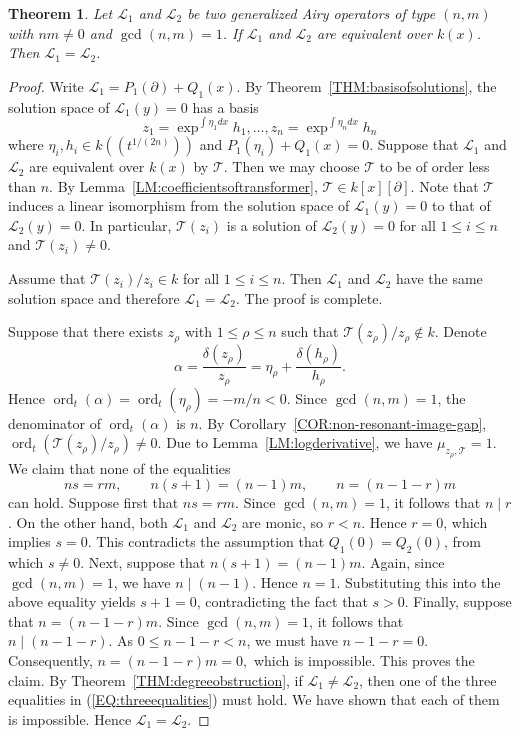 \documentclass{article}
\newtheorem{theorem}{Theorem}[section]
\DeclareMathOperator{\ord}{ord}
\newcommand{\pa}{\partial}
\newcommand{\calL}{{\mathcal{L}}}
\newcommand{\calT}{{\mathcal{T}}}
\begin{document}
\begin{theorem}
  \label{THM:Katzproblem}
  Let $\calL_1$ and $\calL_2$ be two generalized Airy operators of type $(n, m)$ with $nm\neq 0$ 
  and $\gcd(n,m)=1$. If $\calL_1$ and $\calL_2$ are equivalent over $k(x)$. Then $\calL_1 = \calL_2$.
\end{theorem}
\begin{proof}
  Write $\calL_1=P_1(\partial)+Q_1(x)$. By Theorem~\ref{THM:basisofsolutions},
  the solution space of $\calL_1(y)=0$ has a basis 
  $$
    z_1=\exp^{\int \eta_1 dx }h_1, \dots, z_n=\exp^{\int \eta_n dx} h_n
  $$
  where $\eta_i ,h_i\in k((t^{1/(2n)}))$ and $P_1(\eta_i)+Q_1(x)=0$.
  Suppose that $\calL_1$ and $\calL_2$ are equivalent over $k(x)$ by $\calT$. Then 
  we may choose $\calT$ to be of order less than $n$. By Lemma~\ref{LM:coefficientsoftransformer}, 
  $\calT\in k[x][\pa]$. Note that $\calT$ induces a linear isomorphism from 
  the solution space of $\calL_1(y)=0$ to that of $\calL_2(y)=0$. In particular, 
  $\calT(z_i)$ is a solution of $\calL_2(y)=0$ for all $1\leq i \leq n$ and $\calT(z_i)\neq 0$.

  Assume that $\calT(z_i)/z_i\in k$ for all $1\leq i \leq n$. Then $\calL_1$ and $\calL_2$
  have the same solution space and therefore $\calL_1=\calL_2$. The proof is complete. 
  
  Suppose that there exists $z_\rho$ with $1\leq \rho \leq n$ such that $\calT(z_\rho)/z_\rho \notin k$. Denote 
  $$
   \alpha=\frac{\delta(z_\rho)}{z_\rho}=\eta_\rho+\frac{\delta(h_\rho)}{h_\rho}.
  $$
  Hence $\ord_t(\alpha)=\ord_t(\eta_\rho)=-m/n<0$.
  Since $\gcd(n,m)=1$, the denominator of $\ord_t(\alpha)$ is $n$. By Corollary~\ref{COR:non-resonant-image-gap},
  $\ord_t(\calT(z_\rho)/z_\rho)\neq 0$. Due to Lemma~\ref{LM:logderivative}, we have $\mu_{z_\rho,\calT} = 1$.
We claim that none of the equalities
\begin{equation}
\label{EQ:threeequalities}
ns=rm,\qquad n(s+1)=(n-1)m,\qquad
n=(n-1-r)m
\end{equation}
can hold.
Suppose first that $ns=rm$. Since $\gcd(n,m)=1$, it follows that $n\mid r$. On the other hand, both $\calL_1$ and $\calL_2$ are monic, so $r<n$. Hence $r=0$, which implies $s=0$. This contradicts the assumption that $Q_1(0)=Q_2(0)$, from which $s\neq 0$.
Next, suppose that
$
n(s+1)=(n-1)m.
$
Again, since $\gcd(n,m)=1$, we have $n\mid (n-1)$. Hence $n=1$. Substituting this into the above equality yields $s+1=0$, contradicting the fact that $s>0$.
Finally, suppose that
$
n=(n-1-r)m.
$
Since $\gcd(n,m)=1$, it follows that
$
n\mid (n-1-r).
$
As $0\le n-1-r<n$, we must have $n-1-r=0$. Consequently,
$
n=(n-1-r)m=0,
$
which is impossible. This proves the claim. 
By Theorem~\ref{THM:degreeobstruction}, if $\calL_1 \neq \calL_2$, then  one of the three equalities in (\ref{EQ:threeequalities}) must hold.
We have shown that each of them is impossible. Hence $\calL_1=\calL_2$.
\end{proof}
\end{document}
